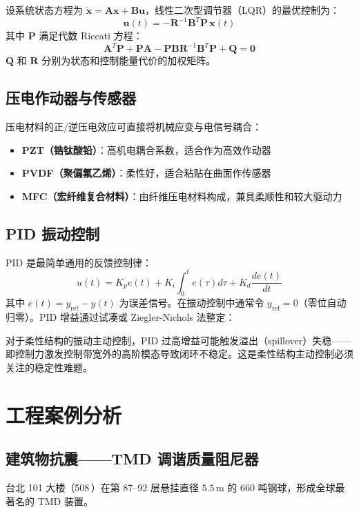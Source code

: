 \begin{myformula}
设系统状态方程为 $\dot{\mathbf{x}} = \mathbf{A}\mathbf{x} + \mathbf{B}\mathbf{u}$，线性二次型调节器（LQR）的最优控制为：
\[
\mathbf{u}(t) = -\mathbf{R}^{-1}\mathbf{B}^{T}\mathbf{P}\,\mathbf{x}(t)
\]
其中 $\mathbf{P}$ 满足代数 Riccati 方程：
\[
\mathbf{A}^{T}\mathbf{P} + \mathbf{P}\mathbf{A} - \mathbf{P}\mathbf{B}\mathbf{R}^{-1}\mathbf{B}^{T}\mathbf{P} + \mathbf{Q} = \mathbf{0}
\]
$\mathbf{Q}$ 和 $\mathbf{R}$ 分别为状态和控制能量代价的加权矩阵。
\end{myformula}

\subsection{压电作动器与传感器}
压电材料的正/逆压电效应可直接将机械应变与电信号耦合：
\begin{itemize}
    \item \textbf{PZT（锆钛酸铅）}：高机电耦合系数，适合作为高效作动器
    \item \textbf{PVDF（聚偏氟乙烯）}：柔性好，适合粘贴在曲面作传感器
    \item \textbf{MFC（宏纤维复合材料）}：由纤维压电材料构成，兼具柔顺性和较大驱动力
\end{itemize}

\subsection{PID 振动控制}
PID 是最简单通用的反馈控制律：
\[
u(t) = K_p e(t) + K_i\int_0^{t} e(\tau)d\tau + K_d\frac{de(t)}{dt}
\]
其中 $e(t) = y_{\text{ref}} - y(t)$ 为误差信号。在振动控制中通常令 $y_{\text{ref}} = 0$（零位自动归零）。PID 增益通过试凑或 Ziegler-Nichols 法整定：

\begin{remark}
对于柔性结构的振动主动控制，PID 过高增益可能触发溢出（spillover）失稳——即控制力激发控制带宽外的高阶模态导致闭环不稳定。这是柔性结构主动控制必须关注的稳定性难题。
\end{remark}

\section{工程案例分析}
\subsection{建筑物抗震——TMD 调谐质量阻尼器}
台北 101 大楼（508\,）在第 87--92 层悬挂直径 $5.5\,\text{m}$ 的 660 吨钢球，形成全球最著名的 TMD 装置。


